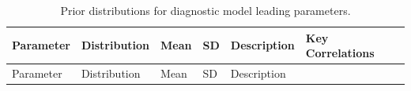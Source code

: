\documentclass[
  11pt,
]{SCreport}
\begin{document}
\begin{landscape}
\end{landscape}

\newpage

\begin{landscape}

\begin{longtable}[]{@{}
  >{\raggedright\arraybackslash}p{}
  >{\raggedright\arraybackslash}p{}
  >{\raggedright\arraybackslash}p{}
  >{\raggedright\arraybackslash}p{}
  >{\raggedright\arraybackslash}p{}
  >{\raggedright\arraybackslash}p{}@{}}
\caption{Prior distributions for diagnostic model leading
parameters.}\label{tbl-priors}\tabularnewline
\toprule\noalign{}
\begin{minipage}[b]{\linewidth}\raggedright
Parameter
\end{minipage} & \begin{minipage}[b]{\linewidth}\raggedright
Distribution
\end{minipage} & \begin{minipage}[b]{\linewidth}\raggedright
Mean
\end{minipage} & \begin{minipage}[b]{\linewidth}\raggedright
SD
\end{minipage} & \begin{minipage}[b]{\linewidth}\raggedright
Description
\end{minipage} & \begin{minipage}[b]{\linewidth}\raggedright
Key Correlations
\end{minipage} \\
\midrule\noalign{}
\endfirsthead
\toprule\noalign{}
\begin{minipage}[b]{\linewidth}\raggedright
Parameter
\end{minipage} & \begin{minipage}[b]{\linewidth}\raggedright
Distribution
\end{minipage} & \begin{minipage}[b]{\linewidth}\raggedright
Mean
\end{minipage} & \begin{minipage}[b]{\linewidth}\raggedright
SD
\end{minipage} & \begin{minipage}[b]{\linewidth}\raggedright
Description

\end{minipage}
\end{longtable}
\end{landscape}
\end{document}
